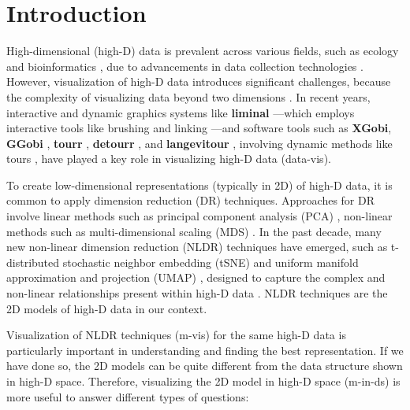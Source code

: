\documentclass[
  12pt]{article}
\begin{document}
\newpage
{} %

\ifdefined\Shaded\renewenvironment{Shaded}{\begin{tcolorbox}[borderline west={3pt}{0pt}{shadecolor}, boxrule=0pt, interior hidden, frame hidden, breakable, sharp corners, enhanced]}{\end{tcolorbox}}\fi

\hypertarget{sec-intro}{%
\section{Introduction}\label{sec-intro}}

High-dimensional (high-D) data is prevalent across various fields, such
as ecology and bioinformatics \citep{Guo2023}, due to advancements in
data collection technologies \citep{Johnstone2009, ayesha2020overview}.
However, visualization of high-D data introduces significant challenges,
because the complexity of visualizing data beyond two dimensions
\citep{Jia2022}. In recent years, interactive and dynamic graphics
systems like \textbf{liminal} \citep{article21} ---which employs
interactive tools like brushing and linking \citep{article58}---and
software tools such as \textbf{XGobi}, \textbf{GGobi} \citep{article60},
\textbf{tourr} \citep{article61}, \textbf{detourr} \citep{article22},
and \textbf{langevitour} \citep{article09}, involving dynamic methods
like tours \citep{Asimov1985}, have played a key role in visualizing
high-D data (data-vis).

To create low-dimensional representations (typically in 2D) of high-D
data, it is common to apply dimension reduction (DR) techniques.
Approaches for DR involve linear methods such as principal component
analysis (PCA) \citep{Karl1901}, non-linear methods such as
multi-dimensional scaling (MDS) \citep{Torgerson1967}. In the past
decade, many new non-linear dimension reduction (NLDR) techniques have
emerged, such as t-distributed stochastic neighbor embedding (tSNE)
\citep{Laurens2008} and uniform manifold approximation and projection
(UMAP) \citep{Leland2018}, designed to capture the complex and
non-linear relationships present within high-D data
\citep{Johnstone2009}. NLDR techniques are the 2D models of high-D data
in our context.

Visualization of NLDR techniques (m-vis) \citep{article59} for the same
high-D data is particularly important in understanding and finding the
best representation. If we have done so, the 2D models can be quite
different from the data structure shown in high-D space. Therefore,
visualizing the 2D model in high-D space (m-in-ds) is more useful to
answer different types of questions:
\end{document}
